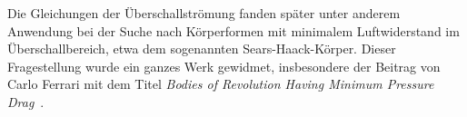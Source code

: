 Die Gleichungen der Überschallströmung fanden später 
unter anderem Anwendung bei der Suche nach Körperformen 
mit minimalem Luftwiderstand im Überschallbereich, 
etwa dem sogenannten Sears-Haack-Körper.
Dieser Fragestellung wurde ein ganzes Werk gewidmet,
insbesondere der Beitrag von Carlo Ferrari mit dem Titel 
%
\textit{Bodies of Revolution Having Minimum Pressure Drag}~\cite{Ferrari1965}.

